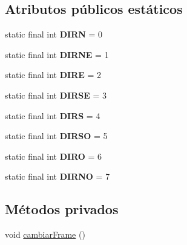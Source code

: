 \subsection*{Atributos públicos estáticos}
\begin{DoxyCompactItemize}
\item 
\hypertarget{classBatallaEspacial_1_1Player_a7877a2867209a8388941aec58b68fb2c}{
static final int {\bfseries DIRN} = 0}
\label{classBatallaEspacial_1_1Player_a7877a2867209a8388941aec58b68fb2c}

\item 
\hypertarget{classBatallaEspacial_1_1Player_acfa5b88dc2b76634efedfcfad1a0dd0a}{
static final int {\bfseries DIRNE} = 1}
\label{classBatallaEspacial_1_1Player_acfa5b88dc2b76634efedfcfad1a0dd0a}

\item 
\hypertarget{classBatallaEspacial_1_1Player_a340908c7db730dd764c95392886d52f6}{
static final int {\bfseries DIRE} = 2}
\label{classBatallaEspacial_1_1Player_a340908c7db730dd764c95392886d52f6}

\item 
\hypertarget{classBatallaEspacial_1_1Player_a310a4ca05c26dd1dbec2b3ae3ffb9e63}{
static final int {\bfseries DIRSE} = 3}
\label{classBatallaEspacial_1_1Player_a310a4ca05c26dd1dbec2b3ae3ffb9e63}

\item 
\hypertarget{classBatallaEspacial_1_1Player_a097e115dfd856126ea7f50ca616ecdd9}{
static final int {\bfseries DIRS} = 4}
\label{classBatallaEspacial_1_1Player_a097e115dfd856126ea7f50ca616ecdd9}

\item 
\hypertarget{classBatallaEspacial_1_1Player_a6b3f96de107188b5cf0eaee0cd04c07a}{
static final int {\bfseries DIRSO} = 5}
\label{classBatallaEspacial_1_1Player_a6b3f96de107188b5cf0eaee0cd04c07a}

\item 
\hypertarget{classBatallaEspacial_1_1Player_a690c8e0b8f6e22653b50f8952c8dc365}{
static final int {\bfseries DIRO} = 6}
\label{classBatallaEspacial_1_1Player_a690c8e0b8f6e22653b50f8952c8dc365}

\item 
\hypertarget{classBatallaEspacial_1_1Player_a2b21c346a0ac52bbe0e55995608f7346}{
static final int {\bfseries DIRNO} = 7}
\label{classBatallaEspacial_1_1Player_a2b21c346a0ac52bbe0e55995608f7346}

\end{DoxyCompactItemize}
\subsection*{Métodos privados}
\begin{DoxyCompactItemize}
\item 
void \hyperlink{classBatallaEspacial_1_1Player_ad836348d00fc448ab0be4e58abc5ff0b}{cambiarFrame} ()
\end{DoxyCompactItemize}
